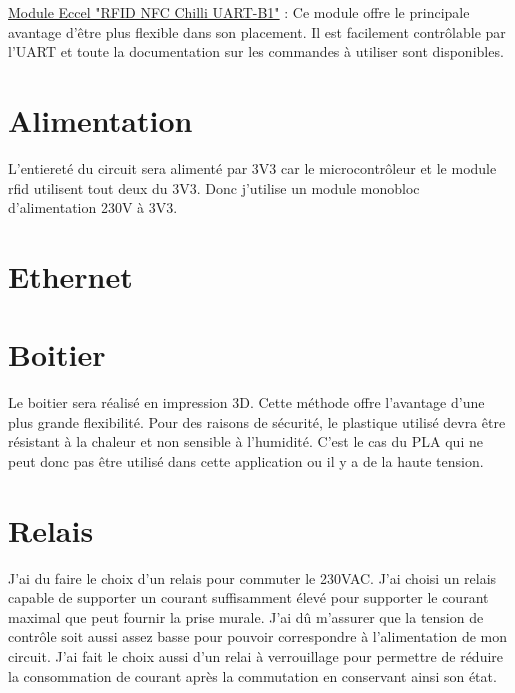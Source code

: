 \vspace{5pt}
\href{https://www.mikroe.com/rfid-click}{Module Eccel "RFID NFC Chilli UART-B1"} : Ce module offre le principale avantage d'être plus flexible dans son placement. Il est facilement contrôlable par l'UART et toute la documentation sur les commandes à utiliser sont disponibles. 

\section{Alimentation}
L'entiereté du circuit sera alimenté par 3V3 car le microcontrôleur et le module rfid utilisent tout deux du 3V3. 
Donc j'utilise un module monobloc d'alimentation 230V à 3V3. 

\section{Ethernet}

\section{Boitier}
Le boitier sera réalisé en impression 3D. Cette méthode offre l'avantage d'une plus grande flexibilité.
Pour des raisons de sécurité, le plastique utilisé devra être résistant à la chaleur et non sensible à l'humidité. C'est le cas du PLA qui ne peut donc pas être utilisé dans cette application ou il y a de la haute tension.

\section{Relais}
J'ai du faire le choix d'un relais pour commuter le 230VAC. J'ai choisi un relais capable de supporter un courant suffisamment élevé pour supporter le courant maximal que peut fournir la prise murale. J'ai dû m'assurer que la tension de contrôle soit aussi assez basse pour pouvoir correspondre à l'alimentation de mon circuit.
J'ai fait le choix aussi d'un relai à verrouillage pour permettre de réduire la consommation de courant après la commutation en conservant ainsi son état.

